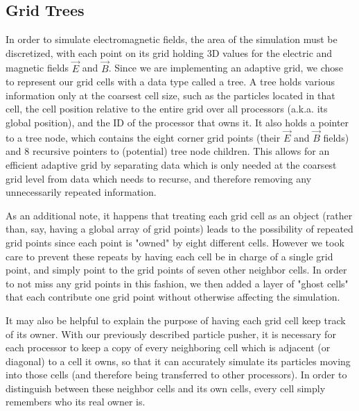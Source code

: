 \documentclass[]{article}
\begin{document}
\subsection{Grid Trees}
In order to simulate electromagnetic fields, the area of the simulation must be discretized, with each point on its grid holding 3D values for the electric and magnetic fields $\vec{E}$ and $\vec{B}$. Since we are implementing an adaptive grid, we chose to represent our grid cells with a data type called a tree. A tree holds various information only at the coarsest cell size, such as the particles located in that cell, the cell position relative to the entire grid over all processors (a.k.a. its global position), and the ID of the processor that owns it. It also holds a pointer to a tree node, which contains the eight corner grid points (their $\vec{E}$ and $\vec{B}$ fields) and 8 recursive pointers to (potential) tree node children. This allows for an efficient adaptive grid by separating data which is only needed at the coarsest grid level from data which needs to recurse, and therefore removing any unnecessarily repeated information.

As an additional note, it happens that treating each grid cell as an object (rather than, say, having a global array of grid points) leads to the possibility of repeated grid points since each point is "owned" by eight different cells. However we took care to prevent these repeats by having each cell be in charge of a single grid point, and simply point to the grid points of seven other neighbor cells. In order to not miss any grid points in this fashion, we then added a layer of "ghost cells" that each contribute one grid point without otherwise affecting the simulation.

It may also be helpful to explain the purpose of having each grid cell keep track of its owner. With our previously described particle pusher, it is necessary for each processor to keep a copy of every neighboring cell which is adjacent (or diagonal) to a cell it owns, so that it can accurately simulate its particles moving into those cells (and therefore being transferred to other processors). In order to distinguish between these neighbor cells and its own cells, every cell simply remembers who its real owner is.
\end{document}
